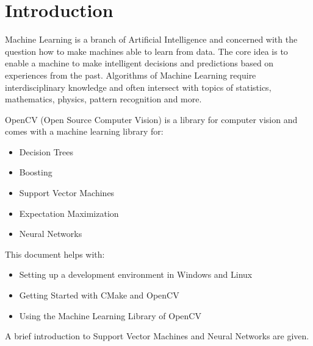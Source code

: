 \section{Introduction}
Machine Learning is a branch of Artificial Intelligence and concerned with the question how to make machines able to learn from data. The core idea is to enable a machine to make intelligent decisions and predictions based on experiences from the past. Algorithms of Machine Learning require interdisciplinary knowledge and often intersect with topics of statistics, mathematics, physics, pattern recognition and more.

OpenCV (Open Source Computer Vision) is a library for computer vision and comes with a machine learning library for:
\begin{itemize}
 \item Decision Trees
 \item Boosting
 \item Support Vector Machines
 \item Expectation Maximization
 \item Neural Networks
\end{itemize}

This document helps with:
\begin{itemize}
 \item Setting up a development environment in Windows and Linux
 \item Getting Started with CMake and OpenCV
 \item Using the Machine Learning Library of OpenCV
\end{itemize}
A brief introduction to Support Vector Machines and Neural Networks are given.